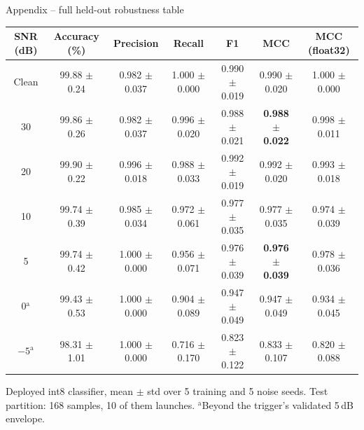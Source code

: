 \documentclass[aspectratio=169,10pt]{beamer}
\newcommand{\hl}[1]{\textbf{\color{accent}#1}}
\begin{document}
\begin{frame}{Appendix -- full held-out robustness table}
  \centering\scriptsize
  \begin{tabular}{@{}ccccccc@{}}
    \toprule
    SNR (dB) & Accuracy (\%) & Precision & Recall & F1 & MCC & MCC (float32)\\
    \midrule
    Clean & 99.88 $\pm$ 0.24 & 0.982 $\pm$ 0.037 & 1.000 $\pm$ 0.000 & 0.990 $\pm$ 0.019 & 0.990 $\pm$ 0.020 & 1.000 $\pm$ 0.000\\
    30 & 99.86 $\pm$ 0.26 & 0.982 $\pm$ 0.037 & 0.996 $\pm$ 0.020 & 0.988 $\pm$ 0.021 & \hl{0.988 $\pm$ 0.022} & 0.998 $\pm$ 0.011\\
    20 & 99.90 $\pm$ 0.22 & 0.996 $\pm$ 0.018 & 0.988 $\pm$ 0.033 & 0.992 $\pm$ 0.019 & 0.992 $\pm$ 0.020 & 0.993 $\pm$ 0.018\\
    10 & 99.74 $\pm$ 0.39 & 0.985 $\pm$ 0.034 & 0.972 $\pm$ 0.061 & 0.977 $\pm$ 0.035 & 0.977 $\pm$ 0.035 & 0.974 $\pm$ 0.039\\
    5 & 99.74 $\pm$ 0.42 & 1.000 $\pm$ 0.000 & 0.956 $\pm$ 0.071 & 0.976 $\pm$ 0.039 & \hl{0.976 $\pm$ 0.039} & 0.978 $\pm$ 0.036\\
    \midrule
    0$^{\mathrm{a}}$ & 99.43 $\pm$ 0.53 & 1.000 $\pm$ 0.000 & 0.904 $\pm$ 0.089 & 0.947 $\pm$ 0.049 & 0.947 $\pm$ 0.049 & 0.934 $\pm$ 0.045\\
    $-5^{\mathrm{a}}$ & 98.31 $\pm$ 1.01 & 1.000 $\pm$ 0.000 & 0.716 $\pm$ 0.170 & 0.823 $\pm$ 0.122 & 0.833 $\pm$ 0.107 & 0.820 $\pm$ 0.088\\
    \bottomrule
  \end{tabular}
  \par\vspace{2mm}
  {\scriptsize\color{ink!70} Deployed int8 classifier, mean $\pm$ std over 5 training and
   5 noise seeds. Test partition: 168 samples, 10 of them launches.
   $^{\mathrm{a}}$Beyond the trigger's validated 5\,dB envelope.}
\end{frame}
\end{document}

